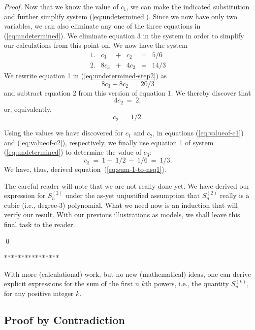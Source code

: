 {\begin{proof}
Now that we know the value of $c_1$, we can make the indicated
substitution and further simplify system (\ref{eq:undetermined}).
Since we now have only two variables, we can also eliminate any one
of the three equations in (\ref{eq:undetermined}).  We eliminate
equation 3 in the system in order to simplify our calculations from
this point on.  We now have the system
\begin{equation}
\label{eq:undetermined-step2}
\begin{array}{lccccc}
1. &
c_3  & + & c_2   & = & 5/6 \\
2. &
8c_3 & + & 4 c_2 & = & 14/3 
\end{array}
\end{equation}
We rewrite equation 1 in (\ref{eq:undetermined-step2}) as
\[ 8 c_3 + 8 c_2 \ = \ 20/3 \]
and subtract equation 2 from this version of equation 1.  We thereby
discover that
\[ 4 c_2 \ = \ 2, \]
or, equivalently,
\begin{equation}
\label{eq:valueof-c2}
c_2 \ = \ 1/2.
\end{equation}

Using the values we have discovered for $c_1$ and $c_2$, in equations
(\ref{eq:valueof-c1}) and (\ref{eq:valueof-c2}), respectively, we
finally use equation 1 of system (\ref{eq:undetermined}) to determine
the value of $c_3$:
\begin{equation}
\label{eq:valueof-c3}
c_3 \ = \ 1 - \ 1/2 \ - \ 1/6 \ = \ 1/3.
\end{equation}
We have, thus, derived equation~(\ref{eq:sum-1-to-nsq1}).

\medskip

The careful reader will note that we are not really done yet.  We
have derived our expression for $S^{(2)}_n$ under the as-yet
unjustified assumption that $S^{(2)}_n$ really is a cubic (i.e.,
degree-$3$) polynomial.  What we need now is an induction that will
verify our result.  With our previous illustrations as models, we
shall leave this final task to the reader.

\qed
\end{proof}
****************}

\bigskip

With more (calculational) work, but no new (mathematical) ideas, one
can derive explicit expressions for the sum of the first $n$ $k$th
powers, i.e., the quantity $S^{(k)}_n$, for any positive integer $k$.


\subsection{Proof by Contradiction}
\label{sec:Contradiction}

